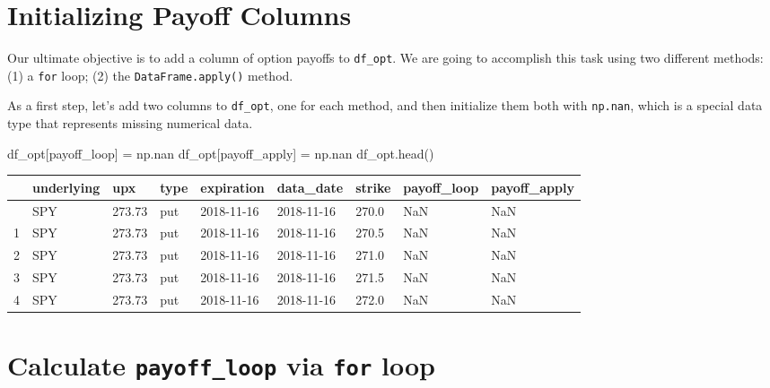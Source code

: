 \documentclass[
  letterpaper,
  DIV=11,
  numbers=noendperiod]{scrreprt}
\newenvironment{Shaded}{\begin{snugshade}}{\end{snugshade}}
\newcommand{\NormalTok}[1]{\textcolor[rgb]{0.00,0.23,0.31}{#1}}
\newcommand{\OperatorTok}[1]{\textcolor[rgb]{0.37,0.37,0.37}{#1}}
\newcommand{\StringTok}[1]{\textcolor[rgb]{0.13,0.47,0.30}{#1}}
\begin{document}
\hypertarget{initializing-payoff-columns}{%
\section{Initializing Payoff
Columns}\label{initializing-payoff-columns}}

Our ultimate objective is to add a column of option payoffs to
\texttt{df\_opt}. We are going to accomplish this task using two
different methods: (1) a \texttt{for} loop; (2) the
\texttt{DataFrame.apply()} method.

As a first step, let's add two columns to \texttt{df\_opt}, one for each
method, and then initialize them both with \texttt{np.nan}, which is a
special data type that represents missing numerical data.

\begin{Shaded}
\begin{Highlighting}[]
\NormalTok{df\_opt[}\StringTok{\textquotesingle{}payoff\_loop\textquotesingle{}}\NormalTok{] }\OperatorTok{=}\NormalTok{ np.nan}
\NormalTok{df\_opt[}\StringTok{\textquotesingle{}payoff\_apply\textquotesingle{}}\NormalTok{] }\OperatorTok{=}\NormalTok{ np.nan}
\NormalTok{df\_opt.head()}
\end{Highlighting}
\end{Shaded}

\begin{longtable}[]{@{}lllllllll@{}}
\toprule\noalign{}
& underlying & upx & type & expiration & data\_date & strike &
payoff\_loop & payoff\_apply \\
\midrule\noalign{}
\endhead
\bottomrule\noalign{}
\endlastfoot
0 & SPY & 273.73 & put & 2018-11-16 & 2018-11-16 & 270.0 & NaN & NaN \\
1 & SPY & 273.73 & put & 2018-11-16 & 2018-11-16 & 270.5 & NaN & NaN \\
2 & SPY & 273.73 & put & 2018-11-16 & 2018-11-16 & 271.0 & NaN & NaN \\
3 & SPY & 273.73 & put & 2018-11-16 & 2018-11-16 & 271.5 & NaN & NaN \\
4 & SPY & 273.73 & put & 2018-11-16 & 2018-11-16 & 272.0 & NaN & NaN \\
\end{longtable}

\hypertarget{calculate-payoff_loop-via-for-loop}{%
\section{\texorpdfstring{Calculate \texttt{payoff\_loop} via
\texttt{for}
loop}{Calculate payoff\_loop via for loop}}\label{calculate-payoff_loop-via-for-loop}}
\end{document}
